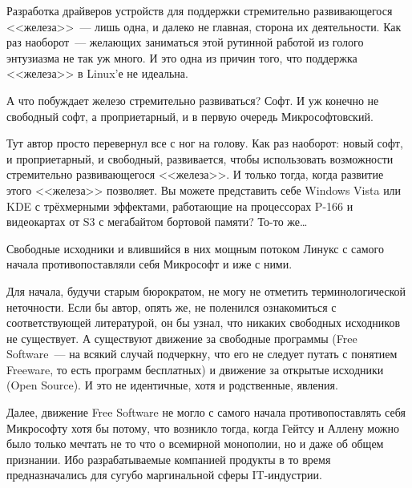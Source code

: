 Разработка драйверов устройств для поддержки стремительно развивающегося <<железа>>~--- лишь одна, и далеко не главная, сторона их деятельности. Как раз наоборот~--- желающих заниматься этой рутинной работой из голого энтузиазма не так уж много. И это одна из причин того, что поддержка <<железа>> в Linux'е не идеальна. 
\begin{shadequote}{}
А что побуждает железо стремительно развиваться? Софт. И уж конечно не свободный софт, а проприетарный, и в первую очередь Микрософтовский.
\end{shadequote}
Тут автор просто перевернул все с ног на голову. Как раз наоборот: новый софт, и проприетарный, и свободный, развивается, чтобы использовать возможности стремительно развивающегося <<железа>>. И только тогда, когда развитие этого <<железа>> позволяет. Вы можете представить себе Windows Vista или KDE с трёхмерными эффектами, работающие на процессорах P-166 и видеокартах от S3 с мегабайтом бортовой памяти? То-то же\dots 
\begin{shadequote}{}
Свободные исходники и влившийся в них мощным потоком Линукс с самого начала противопоставляли себя Микрософт и иже с ними.
\end{shadequote}
Для начала, будучи старым бюрократом, не могу не отметить терминологической неточности. Если бы автор, опять же, не поленился ознакомиться с соответствующей литературой, он бы узнал, что никаких свободных исходников не существует. А существуют движение за свободные программы (Free Software~--- на всякий случай подчеркну, что его не следует путать с понятием Freeware, то есть программ бесплатных) и движение за открытые исходники (Open Source). И это не идентичные, хотя и родственные, явления. 

Далее, движение Free Software не могло с самого начала противопоставлять себя Микрософту хотя бы потому, что возникло тогда, когда Гейтсу и Аллену можно было только мечтать не то что о всемирной монополии, но и даже об общем признании. Ибо разрабатываемые компанией продукты в то время предназначались для сугубо маргинальной сферы IT-индустрии. 

